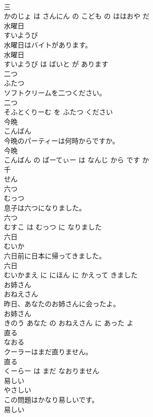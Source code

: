 \documentclass[8pt]{extreport}
\begin{document}
\begin{CJK}{UTF8}{min}
\\	三 
\\	かのじょ は さんにん の こども の ははおや だ			
\\	水曜日	
\\	すいようび			
\\	水曜日はバイトがあります。	
\\	水曜日 
\\	すいようび は ばいと が あります			
\\	二つ	
\\	ふたつ			
\\	ソフトクリームを二つください。	
\\	二つ 
\\	そふとくりーむ を ふたつ ください			
\\	今晩	
\\	こんばん			
\\	今晩のパーティーは何時からですか。	
\\	今晩 
\\	こんばん の ぱーてぃー は なんじ から です か			
\\	千	
\\	せん			
\\	六つ	
\\	むっつ			
\\	息子は六つになりました。	
\\	六つ 
\\	むすこ は むっつ に なりました			
\\	六日	
\\	むいか			
\\	六日前に日本に帰ってきました。	
\\	六日 
\\	むいかまえ に にほん に かえって きました			
\\	お姉さん	
\\	おねえさん			
\\	昨日、あなたのお姉さんに会ったよ。	
\\	お姉さん 
\\	きのう あなた の おねえさん に あった よ			
\\	直る	
\\	なおる			
\\	クーラーはまだ直りません。	
\\	直る 
\\	くーらー は まだ なおりません			
\\	易しい	
\\	やさしい			
\\	この問題はかなり易しいです。	
\\	易しい 

\end{CJK}
\end{document}
